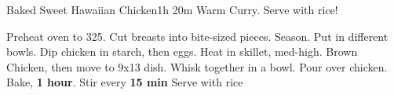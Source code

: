 \documentclass[a6paper,landscape]{article}
\begin{document}
\begin{recipe}{Baked Sweet Hawaiian Chicken}{1h 20m}{}
  \freeform Warm Curry. Serve with rice! 

  Preheat oven to 325. Cut breasts into bite-sized pieces. Season.
  Put in different bowls. Dip chicken in starch, then eggs.
  Heat in skillet, med-high. Brown Chicken, then move to 9x13 dish.
  Whisk together in a bowl. Pour over chicken.
  \newstep Bake, \textbf{1 hour}. Stir every \textbf{15 min}
  \newstep Serve with rice
  \end{recipe}
\end{document}
